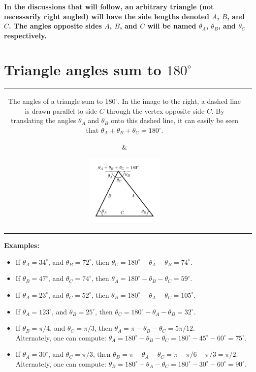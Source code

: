 \documentclass{article}
\begin{document}
{\bf In the discussions that will follow, an arbitrary triangle (not necessarily right angled) will have the side lengths denoted \(A\), \(B\), and \(C\). The angles opposite sides \(A\), \(B\), and \(C\) will be named \(\theta_A\), \(\theta_B\), and \(\theta_C\) respectively.} 

\section*{Triangle angles sum to $180^\circ$}

\begin{tabular}{cc}
\parbox{0.7\textwidth}{
The angles of a triangle sum to \(180^\circ\). In the image to the right, 
a dashed line is drawn parallel to side \(C\) through the vertex opposite side \(C\). By translating the angles \(\theta_A\) and \(\theta_B\) onto this dashed line, it can easily be seen that \(\theta_A + \theta_B + \theta_C = 180^\circ\).
} & \parbox{0.3\textwidth}{
\includegraphics[width = 0.3\textwidth]{triangle_angles_sum_to_180}
}
\end{tabular}

\textbf{Examples:}
\begin{itemize}
\item If \(\theta_A = 34^\circ\), and \(\theta_B = 72^\circ\), then \(\theta_C = 180^\circ - \theta_A - \theta_B = 74^\circ\).   
\item If \(\theta_B = 47^\circ\), and \(\theta_C = 74^\circ\), then \(\theta_A = 180^\circ - \theta_B - \theta_C = 59^\circ\).
\item If \(\theta_A = 23^\circ\), and \(\theta_C = 52^\circ\), then \(\theta_B = 180^\circ - \theta_A - \theta_C = 105^\circ\).
\item If \(\theta_A = 123^\circ\), and \(\theta_B = 25^\circ\), then \(\theta_C = 180^\circ - \theta_A - \theta_B = 32^\circ\).
\item If \(\theta_B = \pi/4\), and \(\theta_C = \pi/3\), then \(\theta_A = \pi - \theta_B - \theta_C = 5\pi/12\). \\
Alternately, one can compute: \(\theta_A = 180^\circ - \theta_B - \theta_C = 180^\circ - 45^\circ - 60^\circ = 75^\circ\).
\item If \(\theta_A = 30^\circ\), and \(\theta_C = \pi/3\), then \(\theta_B = \pi - \theta_A - \theta_C = \pi - \pi/6 - \pi/3 = \pi/2\). \\
Alternately, one can compute: \(\theta_B = 180^\circ - \theta_A - \theta_C = 180^\circ - 30^\circ - 60^\circ = 90^\circ\).
\end{itemize}
\end{document}
